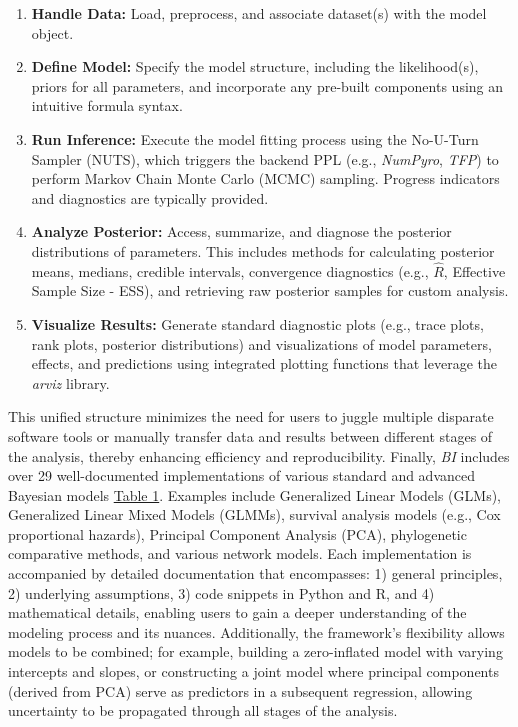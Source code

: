 \documentclass[num-refs]{wiley-article}
\begin{document}
\begin{enumerate}
  \item  \textbf{Handle Data:} Load, preprocess, and associate dataset(s) with the model object.
 
  \item  \textbf{Define Model:} Specify the model structure, including the likelihood(s), priors for all parameters, and incorporate any pre-built components using an intuitive formula syntax.
  \item  \textbf{Run Inference:} Execute the model fitting process using the No-U-Turn Sampler (NUTS), which triggers the backend PPL (e.g., \textit{NumPyro}, \textit{TFP}) to perform Markov Chain Monte Carlo (MCMC) sampling. Progress indicators and diagnostics are typically provided.
 
  \item  \textbf{Analyze Posterior:} Access, summarize, and diagnose the posterior distributions of parameters. This includes methods for calculating posterior means, medians, credible intervals, convergence diagnostics (e.g., $\hat{R}$, Effective Sample Size - ESS), and retrieving raw posterior samples for custom analysis.
  
  \item  \textbf{Visualize Results:} Generate standard diagnostic plots (e.g., trace plots, rank plots, posterior distributions) and visualizations of model parameters, effects, and predictions using integrated plotting functions that leverage the \textit{arviz} library.
\end{enumerate}

 This unified structure minimizes the need for users to juggle multiple disparate software tools or manually transfer data and results between different stages of the analysis, thereby enhancing efficiency and reproducibility. Finally, \textit{BI} includes over 29 well-documented implementations of various standard and advanced Bayesian models \hyperlink{tab1}{Table 1}. Examples include Generalized Linear Models (GLMs), Generalized Linear Mixed Models (GLMMs), survival analysis models (e.g., Cox proportional hazards), Principal Component Analysis (PCA), phylogenetic comparative methods, and various network models. Each implementation is accompanied by detailed documentation that encompasses: 1) general principles, 2) underlying assumptions, 3) code snippets in Python and R, and 4) mathematical details, enabling users to gain a deeper understanding of the modeling process and its nuances. Additionally, the framework's flexibility allows models to be combined; for example, building a zero-inflated model with varying intercepts and slopes, or constructing a joint model where principal components (derived from PCA) serve as predictors in a subsequent regression, allowing uncertainty to be propagated through all stages of the analysis.
\end{document}
